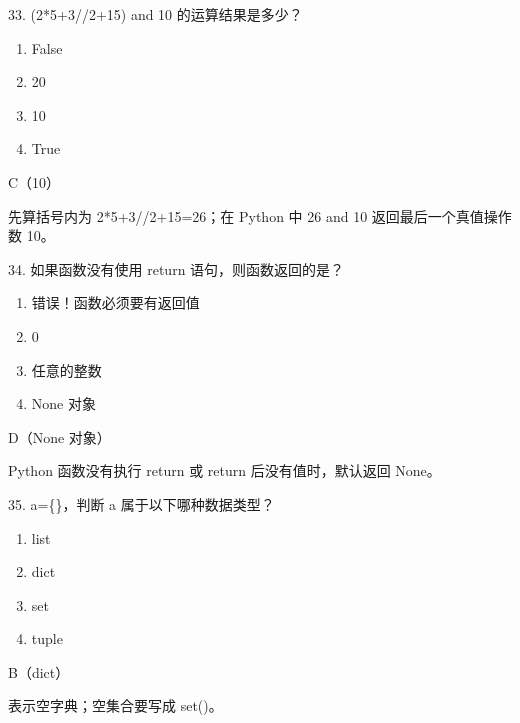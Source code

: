 \begin{question}{33. (2*5+3//2+15) and 10 的运算结果是多少？}
\begin{enumerate}[label=\Alph*., leftmargin=2.4em, itemsep=0.2em]
\item False
\item 20
\item 10
\item True
\end{enumerate}
\end{question}
\begin{answer}
C（10）
\end{answer}
\begin{explanation}
先算括号内为 2*5+3//2+15=26；在 Python 中 26 and 10 返回最后一个真值操作数 10。
\end{explanation}

\begin{question}{34. 如果函数没有使用 return 语句，则函数返回的是？}
\begin{enumerate}[label=\Alph*., leftmargin=2.4em, itemsep=0.2em]
\item 错误！函数必须要有返回值
\item 0
\item 任意的整数
\item None 对象
\end{enumerate}
\end{question}
\begin{answer}
D（None 对象）
\end{answer}
\begin{explanation}
Python 函数没有执行 return 或 return 后没有值时，默认返回 None。
\end{explanation}

\begin{question}{35. a=\{\}，判断 a 属于以下哪种数据类型？}
\begin{enumerate}[label=\Alph*., leftmargin=2.4em, itemsep=0.2em]
\item list
\item dict
\item set
\item tuple
\end{enumerate}
\end{question}
\begin{answer}
B（dict）
\end{answer}
\begin{explanation}
{} 表示空字典；空集合要写成 set()。
\end{explanation}

